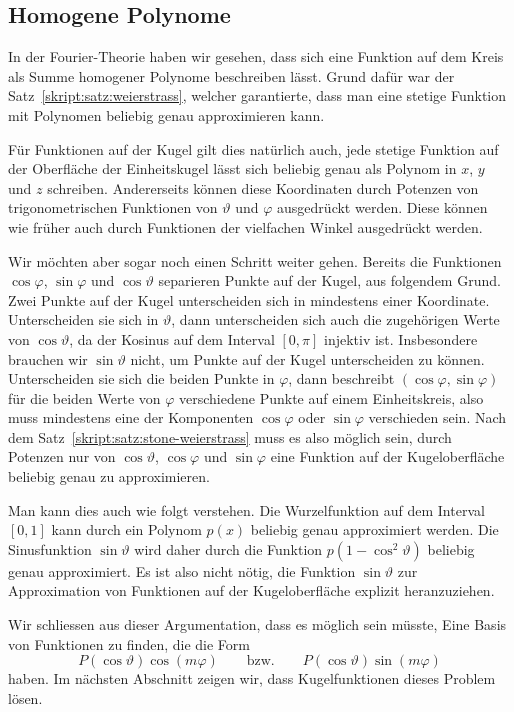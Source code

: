 \subsection{Homogene Polynome}
In der Fourier-Theorie haben wir gesehen, dass sich eine Funktion
auf dem Kreis als Summe homogener Polynome beschreiben lässt.
Grund dafür war der Satz~\ref{skript:satz:weierstrass}, welcher
garantierte, dass man eine stetige Funktion mit Polynomen beliebig genau
approximieren kann.

Für Funktionen auf der Kugel gilt dies natürlich auch, jede stetige
Funktion auf der Oberfläche der Einheitskugel lässt sich beliebig
genau als Polynom in $x$, $y$ und $z$ schreiben.
Andererseits können diese Koordinaten durch Potenzen von trigonometrischen
Funktionen von $\vartheta$ und $\varphi$ ausgedrückt werden.
Diese können wie früher auch durch Funktionen der vielfachen Winkel
ausgedrückt werden.

Wir möchten aber sogar noch einen Schritt weiter gehen.
Bereits die Funktionen $\cos\varphi$, $\sin\varphi$ und $\cos\vartheta$
separieren Punkte auf der Kugel, aus folgendem Grund.
Zwei Punkte auf der Kugel unterscheiden sich in mindestens einer 
Koordinate.
Unterscheiden sie sich in $\vartheta$, dann unterscheiden sich auch
die zugehörigen Werte von $\cos\vartheta$, da der Kosinus auf dem
Interval $[0,\pi]$ injektiv ist.
Insbesondere brauchen wir $\sin\vartheta$ nicht, um Punkte auf der 
Kugel unterscheiden zu können.
Unterscheiden sie sich die beiden Punkte in $\varphi$, dann beschreibt
$(\cos\varphi,\sin\varphi)$ für die beiden Werte von $\varphi$ verschiedene
Punkte auf einem Einheitskreis, also muss mindestens eine der
Komponenten $\cos\varphi$ oder $\sin\varphi$ verschieden sein.
Nach dem Satz~\ref{skript:satz:stone-weierstrass} muss es also 
möglich sein, durch Potenzen nur von $\cos\vartheta$, $\cos\varphi$
und $\sin\varphi$ eine Funktion auf der Kugeloberfläche beliebig genau
zu approximieren.

Man kann dies auch wie folgt verstehen.
Die Wurzelfunktion auf dem Interval $[0,1]$ kann durch ein Polynom $p(x)$
beliebig genau approximiert werden.
Die Sinusfunktion $\sin\vartheta$ wird daher durch die Funktion
$p(1-\cos^2\vartheta)$ beliebig genau approximiert.
Es ist also nicht nötig, die Funktion $\sin\vartheta$ zur Approximation
von Funktionen auf der Kugeloberfläche explizit heranzuziehen.

Wir schliessen aus dieser Argumentation, dass es möglich sein müsste,
Eine Basis von Funktionen zu finden, die die Form
\[
P(\cos\vartheta) \cos(m\varphi)
\qquad
\text{bzw.}
\qquad
P(\cos\vartheta) \sin(m\varphi)
\]
haben.
Im nächsten Abschnitt zeigen wir, dass Kugelfunktionen dieses Problem lösen.

